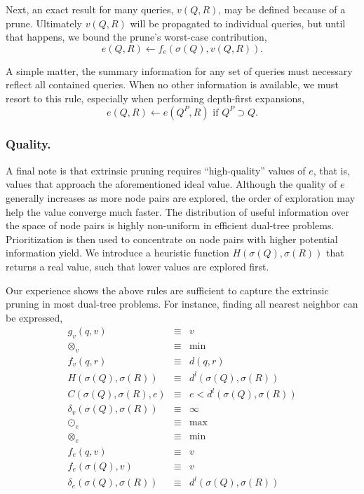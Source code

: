 \documentclass[twoside,leqno,twocolumn]{article}
\newcommand{\summary}{\delta}
\newcommand{\mysubsub}[1]{\subsubsection{#1.}}
\newcommand{\kdparent}[1]{#1^{\!P}}
\newcommand{\lo}[1]{#1^{l}}
\newcommand{\distlo}{\lo{d}}
\newcommand{\dist}[2]{d(#1,#2)}
\newcommand{\nameop}[2]{#1_{\!#2}}
\newcommand{\myop}[1]{\nameop{\otimes}{#1}}
\newcommand{\letterqr}{v}
\newcommand{\inqr}{v}
\newcommand{\opqr}{\myop{\letterqr}}
\newcommand{\fqr}{f_{\letterqr}}
\newcommand{\gqr}{g_{\letterqr}}
\newcommand{\letterqrv}{v}
\newcommand{\inqrv}{v}
\newcommand{\deltaqrv}{\summary_{\letterqrv}}
\newcommand{\lettermu}{e}
\newcommand{\inmu}{e}
\newcommand{\outopmu}{\nameop{\odot}{\lettermu}}
\newcommand{\opmu}{\myop{\lettermu}}
\newcommand{\fmu}{f_{\lettermu}}
\newcommand{\fmuv}{f_{\lettermu}}
\newcommand{\deltamu}{\summary_{\lettermu}}
\newcommand{\canprunemu}{C}
\newcommand{\heurqr}{H}
\newcommand{\outstat}{\sigma}
\begin{document}
Next, an exact result for many queries, $\inqrv(Q, R)$, may be defined because of a prune.
Ultimately $\inqrv(Q, R)$ will be propagated to individual queries, but until that happens, we bound the prune's worst-case contribution,
\begin{equation}
\inmu(Q, R) \gets \fmuv(\outstat(Q), \inqrv(Q, R)).
\label{eqn:muprune}
\end{equation}

\noindent
A simple matter, the summary information for any set of queries must necessary reflect all contained queries.
When no other information is available, we must resort to this rule, especially when performing depth-first expansions,
\begin{equation}
\inmu(Q, R) \gets \inmu(\kdparent{Q}, R) \text{ if } \kdparent{Q} \supset Q.
\label{eqn:muparent}
\end{equation}

\mysubsub{Quality}
A final note is that extrinsic pruning requires ``high-quality'' values of $\inmu$, that is, values that approach the aforementioned ideal value.
Although the quality of $\lettermu$ generally increases as more node pairs are explored, the order of exploration may help the value converge much faster.
The distribution of useful information over the space of node pairs is highly non-uniform in efficient dual-tree problems.
Prioritization is then used to concentrate on node pairs with higher potential information yield.
We introduce a heuristic function $\heurqr(\outstat(Q),\outstat(R))$ that returns a real value, such that lower values are explored first.

Our experience shows the above rules are sufficient to capture the extrinsic pruning in most dual-tree problems.
For instance, finding all nearest neighbor can be expressed,
\begin{eqnarray*}
\gqr(q, \inqr) &\equiv& \inqr
\\
\opqr &\equiv& \min
\\
\fqr(q,r) &\equiv& \dist{q}{r}
\\
\heurqr(\outstat(Q),\outstat(R)) &\equiv& \distlo(\outstat(Q), \outstat(R))
\\
\canprunemu(\outstat(Q), \outstat(R), \lettermu)
 &\equiv& \lettermu < \distlo(\outstat(Q), \outstat(R))
\\
\deltaqrv(\outstat(Q),\outstat(R)) &\equiv& \infty
\\
\outopmu &\equiv& \max
\\
\opmu &\equiv& \min
\\
\fmu(q, \letterqr) &\equiv& \letterqr
\\
\fmuv(\outstat(Q), \letterqrv) &\equiv& \letterqrv
\\
\deltamu(\outstat(Q),\outstat(R)) &\equiv& \distlo(\outstat(Q),\outstat(R))
\end{eqnarray*}
\end{document}
